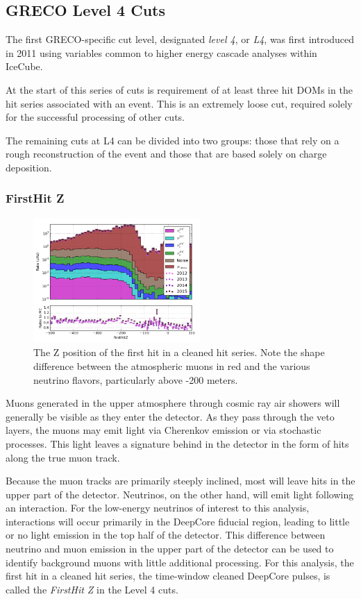 \graphicspath{{chapters/greco/images/level4/}}

\subsection{GRECO Level 4 Cuts}
The first GRECO-specific cut level, designated \emph{level 4}, or \emph{L4}, was first introduced in 2011 using variables common to higher energy cascade analyses within IceCube. 

At the start of this series of cuts is requirement of at least three hit DOMs in the hit series associated with an event. 
This is an extremely loose cut, required solely for the successful processing of other cuts.

The remaining cuts at L4 can be divided into two groups: those that rely on a rough reconstruction of the event and those that are based solely on charge deposition.

\subsubsection{FirstHit Z}
\begin{figure}[h]
	\centering
		\includegraphics[width=2.5in]{FirstHitZ_log.png}
		\caption[The FirstHit Z position]{The Z position of the first hit in a cleaned hit series. Note the shape difference between the atmospheric muons in red and the various neutrino flavors, particularly above -200 meters.}
	\label{fig:firsthitz_log}
\end{figure}

Muons generated in the upper atmosphere through cosmic ray air showers will generally be visible as they enter the detector. 
As they pass through the veto layers, the muons may emit light via Cherenkov emission or via stochastic processes. 
This light leaves a signature behind in the detector in the form of hits along the true muon track. 

Because the muon tracks are primarily steeply inclined, most will leave hits in the upper part of the detector.
Neutrinos, on the other hand, will emit light following an interaction.
For the low-energy neutrinos of interest to this analysis, interactions will occur primarily in the DeepCore fiducial region, leading to little or no light emission in the top half of the detector. 
This difference between neutrino and muon emission in the upper part of the detector can be used to identify background muons with little additional processing.
For this analysis, the first hit in a cleaned hit series, the time-window cleaned DeepCore pulses, is called the \emph{FirstHit Z} in the Level 4 cuts.

